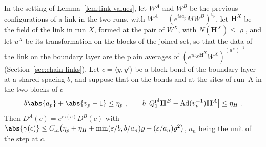 

\begin{lemma}\label{lem:link-data}
In the setting of Lemma~\ref{lem:link-values}, let $W^A$ and $W^B$ be the previous configurations of a link in the two runs, with $W^A = (e^{i\varepsilon a_p}MW^B)^{v_p}$, let $\mathbf H^X$ be the field of the link in run $X$, formed at the pair of $W^X$, with $N(\mathbf H^X) \leq \varrho$, and let $u^X$ be its transformation \cite[(106)]{BalabanAVG} on the blocks of the joined set, so that the data of the link on the boundary layer are the plain averages of $(e^{ih_X\mathbf H^X}W^X)^{(u^X)^{-1}}$ (Section~\ref{sec:chain-links}). Let $c = \langle y, y'\rangle$ be a block bond of the boundary layer at a shared spacing $b$, and suppose that on the bonds and at the sites of run~A in the two blocks of $c$
\[
    b\abs{a_p} + \abs{v_p - 1} \leq \eta_p\;,
    \qquad
    b\,\bigl\lvert Q^{\mathrm{pl}}_1\mathbf H^B - \operatorname{Ad}(v_p^{-1})\mathbf H^A\bigr\rvert \leq \eta_H\;.
\]
Then $D^A(c) = e^{i\gamma(c)}D^B(c)$ with $\abs{\gamma(c)} \leq C_{\mathrm{ld}}\bigl(\eta_p + \eta_H + \min(\varepsilon/b, b/a_n)\varrho + (\varepsilon/a_n)\varrho^2\bigr)$, $a_n$ being the unit of the step at $c$.
\end{lemma}

